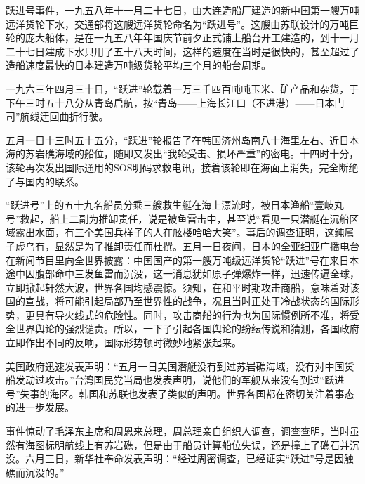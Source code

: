 \begin{maonote}
跃进号事件，一九五八年十一月二十七日，由大连造船厂建造的新中国第一艘万吨远洋货轮下水，交通部将这艘远洋货轮命名为“跃进号”。这艘由苏联设计的万吨巨轮的庞大船体，是在一九五八年年国庆节前夕正式铺上船台开工建造的，到十一月二十七日建成下水只用了五十八天时间，这样的速度在当时是很快的，甚至超过了造船速度最快的日本建造万吨级货轮平均三个月的船台周期。

一九六三年四月三十日，“跃进”轮载着一万三千四百吨吨玉米、矿产品和杂货，于下午三时五十八分从青岛启航，按“青岛——上海长江口（不进港）——日本门司”航线迂回曲折行驶。

五月一日十三时五十五分，“跃进”轮报告了在韩国济州岛南八十海里左右、近日本海的苏岩礁海域的船位，随即又发出“我轮受击、损坏严重”的密电。十四时十分，该轮再次发出国际通用的SOS明码求救电讯，接着该轮即在海面上消失，完全断绝了与国内的联系。

“跃进号”上的五十九名船员分乘三艘救生艇在海上漂流时，被日本渔船“壹岐丸号”救起，船上二副为推卸责任，说是被鱼雷击中，甚至说“看见一只潜艇在沉船区域露出水面，有三个美国兵样子的人在舷楼哈哈大笑”。事后的调查证明，这纯属子虚乌有，显然是为了推卸责任而杜撰。五月一日夜间，日本的全亚细亚广播电台在新闻节目里向全世界披露：中国国产的第一艘万吨级远洋货轮“跃进”号在来日本途中因腹部命中三发鱼雷而沉没，这一消息犹如原子弹爆炸一样，迅速传遍全球，立即掀起轩然大波，世界各国均感震惊。须知，在和平时期攻击商船，意味着对该国的宣战，将可能引起局部乃至世界性的战争，况且当时正处于冷战状态的国际形势，更具有导火线式的危险性。同时，攻击商船的行为也为国际惯例所不准，将受全世界舆论的强烈谴责。所以，一下子引起各国舆论的纷纭传说和猜测，各国政府立即作出不同的反响，国际形势顿时微妙地紧张起来。

美国政府迅速发表声明：“五月一日美国潜艇没有到过苏岩礁海域，没有对中国货船发动过攻击。”台湾国民党当局也发表声明，说他们的军舰从来没有到过“跃进号”失事的海区。韩国和苏联也发表了类似的声明。世界各国都在密切关注着事态的进一步发展。

事件惊动了毛泽东主席和周恩来总理，周总理亲自组织人调查，调查查明，当时虽然有海图标明航线上有苏岩礁，但是由于船员计算船位失误，还是撞上了礁石并沉没。六月三日，新华社奉命发表声明：“经过周密调查，已经证实“跃进”号是因触礁而沉没的。”
\end{maonote}
